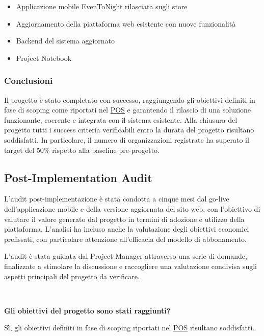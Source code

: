 \documentclass[11pt,a4paper]{article}
\providecommand{\tightlist}{\setlength{\itemsep}{0pt}\setlength{\parskip}{0pt}}
\begin{document}
\begin{itemize}
\tightlist
\item
  {Applicazione mobile EvenToNight rilasciata sugli store}
\item
  {Aggiornamento della piattaforma web esistente con nuove funzionalità}
\item
  {Backend del sistema aggiornato}
\item
  {Project Notebook}
\end{itemize}

{}

\subsubsection*{Conclusioni}

{Il progetto è stato completato con successo, raggiungendo gli obiettivi definiti in fase di scoping come riportati nel \hyperref[sec:pos]{POS} e garantendo il rilascio di una soluzione funzionante, coerente e integrata con il sistema esistente. }{Alla chiusura del progetto tutti i success criteria verificabili entro la durata del progetto risultano soddisfatti. In particolare, il numero di organizzazioni registrate ha superato il target del 50\% rispetto alla baseline pre-progetto.}

\subsection{\texorpdfstring{{Post-Implementation Audit}}{Post-Implementation Audit}}\label{h.u75z8z74qt39}

{L’audit post-implementazione è stata condotta a cinque mesi dal go-live dell’applicazione mobile e della versione aggiornata del sito web, con l’obiettivo di valutare il valore generato dal progetto in termini di adozione e utilizzo della piattaforma. L’analisi ha incluso anche la valutazione degli obiettivi economici prefissati, con particolare attenzione all’efficacia del modello di abbonamento. }

{L’audit è stata guidata dal Project Manager attraverso una serie di domande, finalizzate a stimolare la discussione e raccogliere una valutazione condivisa sugli aspetti principali del progetto da verificare.}

{~}

\medskip\noindent\textbf{Gli obiettivi del progetto sono stati raggiunti?}\par\smallskip

{Sì, gli obiettivi definiti in fase di scoping riportati nel \hyperref[sec:pos]{POS} risultano soddisfatti.}
\end{document}
